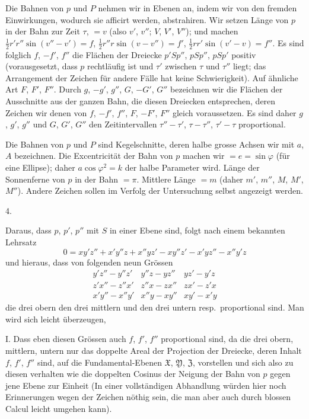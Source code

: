 Die Bahnen von $p$ und $P$ nehmen wir in Ebenen an, indem wir von den fremden Einwirkungen, wodurch sie afficirt werden, abstrahiren. Wir setzen Länge von $p$ in der Bahn zur Zeit $\tau$, $=v$ (also $v'$, $v''$; $V$, $V'$, $V''$); und machen $\frac12r'r''\sin(v''-v')=f$, $\frac12r''r\sin(v-v'')=f'$, $\frac12rr'\sin(v'-v)=f''$. Es sind folglich $f$, $-f'$, $f''$ die Flächen der Dreiecke $p'Sp''$, $pSp''$, $pSp'$ positiv (vorausgesetzt, dass $p$ rechtläufig ist und $\tau'$ zwischen $\tau$ und $\tau''$ liegt; das Arrangement der Zeichen für andere Fälle hat keine Schwierigkeit). Auf ähnliche Art $F$, $F'$, $F''$. Durch $g$, $-g'$, $g''$, $G$, $-G'$, $G''$ bezeichnen wir die Flächen der Ausschnitte aus der ganzen Bahn, die diesen Dreiecken entsprechen, deren Zeichen wir denen von $f$, $-f'$, $f''$, $F$, $-F'$, $F''$ gleich voraussetzen. Es sind daher $g$, $g'$, $g''$ und $G$, $G'$, $G''$ den Zeitintervallen $\tau''-\tau'$, $\tau-\tau''$, $\tau'-\tau$ proportional.

%
Die Bahnen von $p$ und $P$ sind Kegelschnitte, deren halbe grosse Achsen wir mit $a$, $A$ bezeichnen. Die Excentricität der Bahn von $p$ machen wir $=e=\sin\varphi$ (für eine Ellipse); daher $a\cos\varphi^2=k$ der halbe Parameter wird. Länge der Sonnenferne von $p$ in der Bahn $=\pi$. Mittlere Länge $=m$ (daher $m'$, $m''$, $M$, $M'$, $M''$). Andere Zeichen sollen im Verfolg der Untersuchung selbst angezeigt werden.

\begin{center}4.\end{center}
Daraus, dass $p$, $p'$, $p''$ mit $S$ in einer Ebene sind, folgt nach einem bekannten Lehrsatz
\[
0=xy'z''+x'y''z+x''yz'-xy''z'-x'yz''-x''y'z
\]
und hieraus, dass von folgenden neun Grössen
\[
\begin{array}{ccc}
y'z''-y''z'&y''z-yz''&yz'-y'z\\
z'x''-z''x'&z''x-zx''&zx'-z'x\\
x'y''-x''y'&x''y-xy''&xy'-x'y
\end{array}
\]
die drei obern den drei mittlern und den drei untern resp.\ proportional sind. Man wird sich leicht überzeugen,

I. Dass eben diesen Grössen auch $f$, $f'$, $f''$ proportional sind, da die drei obern, mittlern, untern nur das doppelte Areal der Projection der Dreiecke, deren Inhalt $f$, $f'$, $f''$ sind, auf die Fundamental-Ebenen $\mathfrak{X}$, $\mathfrak{Y}$, $\mathfrak{Z}$, vorstellen und sich also zu diesen verhalten wie die doppelten Cosinus der Neigung der Bahn von $p$ gegen jene Ebene zur Einheit (In einer vollständigen Abhandlung würden hier noch Erinnerungen wegen der Zeichen nöthig sein, die man aber auch durch blossen Calcul leicht umgehen kann).

